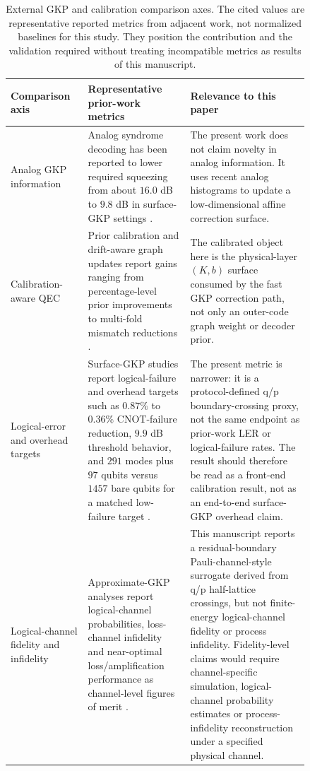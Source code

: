 \documentclass[11pt]{article}
\begin{document}
\begin{table}[htbp]
\centering
\small
\begin{tabular}{@{}>{\raggedright\arraybackslash}p{0.19\linewidth}>{\raggedright\arraybackslash}p{0.30\linewidth}>{\raggedright\arraybackslash}p{0.35\linewidth}@{}}
\toprule
Comparison axis & Representative prior-work metrics & Relevance to this paper \\
\midrule
Analog GKP information &
Analog syndrome decoding has been reported to lower required squeezing from
about \(16.0\) dB to \(9.8\) dB in surface-GKP settings
\cite{fukui2018,noh2020}. &
The present work does not claim novelty in analog information.  It uses recent
analog histograms to update a low-dimensional affine correction surface. \\
\addlinespace
Calibration-aware QEC &
Prior calibration and drift-aware graph updates report gains ranging from
percentage-level prior improvements to multi-fold mismatch reductions
\cite{dgr2023,chen2022,sivak2024}. &
The calibrated object here is the physical-layer \((K,b)\) surface consumed by
the fast GKP correction path, not only an outer-code graph weight or decoder
prior. \\
\addlinespace
Logical-error and overhead targets &
Surface-GKP studies report logical-failure and overhead targets such as
\(0.87\%\) to \(0.36\%\) CNOT-failure reduction, \(9.9\) dB threshold behavior,
and \(291\) modes plus \(97\) qubits versus \(1457\) bare qubits for a matched
low-failure target \cite{noh2022}. &
The present metric is narrower: it is a protocol-defined q/p boundary-crossing
proxy, not the same endpoint as prior-work LER or logical-failure rates.  The
result should therefore be read as a front-end calibration result, not as an
end-to-end surface-GKP overhead claim. \\
\addlinespace
Logical-channel fidelity and infidelity &
Approximate-GKP analyses report logical-channel probabilities, loss-channel
infidelity and near-optimal loss/amplification performance as channel-level
figures of merit \cite{jafarzadeh2025,hastrup2023,zheng2024}. &
This manuscript reports a residual-boundary Pauli-channel-style
surrogate derived from q/p half-lattice crossings, but not finite-energy
logical-channel fidelity or process infidelity.  Fidelity-level claims would
require channel-specific simulation, logical-channel probability estimates or
process-infidelity reconstruction under a specified physical channel. \\
\bottomrule
\end{tabular}
\caption{External GKP and calibration comparison axes.  The cited values are
representative reported metrics from adjacent work, not normalized baselines
for this study.  They position the contribution and the validation required
without treating incompatible metrics as results of this manuscript.}
\label{tab:external-comparison}
\end{table}
\end{document}
